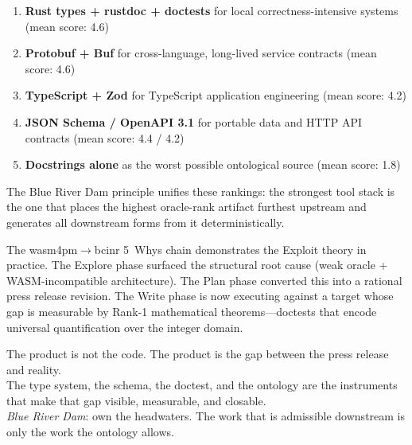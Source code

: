 \documentclass[11pt,a4paper]{article}
\theoremstyle{definition}
\begin{document}
\begin{enumerate}
\item \textbf{Rust types + rustdoc + doctests} for local correctness-intensive systems (mean score: 4.6)
\item \textbf{Protobuf + Buf} for cross-language, long-lived service contracts (mean score: 4.6)
\item \textbf{TypeScript + Zod} for TypeScript application engineering (mean score: 4.2)
\item \textbf{JSON Schema / OpenAPI 3.1} for portable data and HTTP API contracts (mean score: 4.4 / 4.2)
\item \textbf{Docstrings alone} as the worst possible ontological source (mean score: 1.8)
\end{enumerate}

The Blue River Dam principle unifies these rankings: the strongest tool stack is the one that places the highest oracle-rank artifact furthest upstream and generates all downstream forms from it deterministically.

The wasm4pm$\to$bcinr 5~Whys chain demonstrates the Exploit theory in practice. The Explore phase surfaced the structural root cause (weak oracle + WASM-incompatible architecture). The Plan phase converted this into a rational press release revision. The Write phase is now executing against a target whose gap is measurable by Rank-1 mathematical theorems---doctests that encode universal quantification over the integer domain.

\begin{rulebox}
The product is not the code. The product is the gap between the press release and reality.\\[4pt]
The type system, the schema, the doctest, and the ontology are the instruments that make that gap visible, measurable, and closable.\\[4pt]
\textit{Blue River Dam}: own the headwaters. The work that is admissible downstream is only the work the ontology allows.
\end{rulebox}
\end{document}
